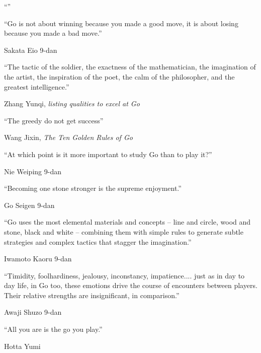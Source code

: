 \documentclass[mcrownvopaper,10pt,onecolumn,final]{memoir}
\begin{document}
\vspace*{\fill}
\epigraph{``''}{}

\vspace*{\fill}
\epigraph{``Go is not about winning because you made a good move, it is about losing because you made a bad move.''}{Sakata Eio 9-dan}

\vspace*{\fill}
\epigraph{``The tactic of the soldier, the exactness of the mathematician, the imagination of the artist, the inspiration of the poet, the calm of the philosopher, and the greatest intelligence.''}{Zhang Yunqi, \textit{listing qualities to excel at Go}}

\vspace*{\fill}
\epigraph{``The greedy do not get success''}{Wang Jixin, \textit{The Ten Golden Rules of Go}}

\vspace*{\fill}
\epigraph{``At which point is it more important to study Go than to play it?''}{Nie Weiping 9-dan}

\vspace*{\fill}
\epigraph{``Becoming one stone stronger is the supreme enjoyment.''}{Go Seigen 9-dan}

\vspace*{\fill}
\epigraph{``Go uses the most elemental materials and concepts -- line and circle, wood and stone, black and white -- combining them with simple rules to generate subtle strategies and complex tactics that stagger the imagination.''}{Iwamoto Kaoru 9-dan}

\vspace*{\fill}
\epigraph{``Timidity, foolhardiness, jealousy, inconstancy, impatience.... just as in day to day life, in Go too, these emotions drive the course of encounters between players. Their relative strengths are insignificant, in comparison.''}{Awaji Shuzo 9-dan}

\vspace*{\fill}
\epigraph{``All you are is the go you play.''}{Hotta Yumi}
\end{document}
